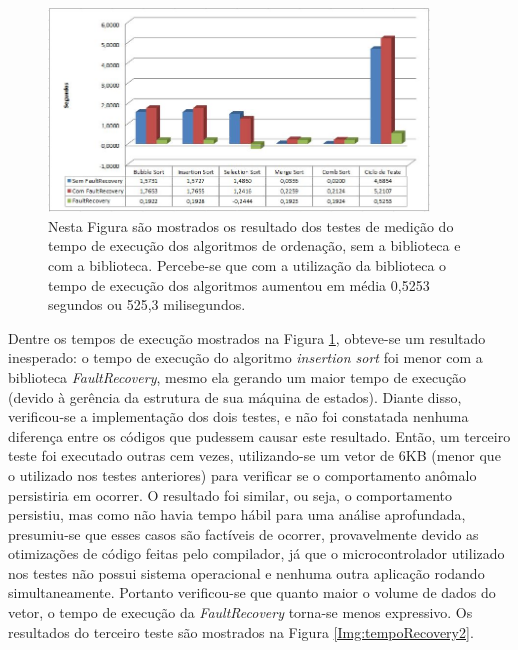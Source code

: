\begin{figure}[h]
	\centering
	\includegraphics[width=0.9\textwidth]{figuras/tempoRecovery.jpg}
	\caption[Tempo de execução da biblioteca \textit{FaultRecovery}]{Nesta Figura são mostrados os resultado dos testes de medição do tempo de execução dos algoritmos de ordenação, sem a biblioteca e com a biblioteca. Percebe-se que com a utilização da biblioteca o tempo de execução dos algoritmos aumentou em média 0,5253 segundos ou 525,3 milisegundos.}
	\label{Img:tempoRecovery}	
\end{figure}	
\newpage
Dentre os tempos de execução mostrados na Figura \ref{Img:tempoRecovery}, obteve-se um resultado inesperado: o tempo de execução do algoritmo \textit{insertion sort} foi menor com a biblioteca \textit{FaultRecovery}, mesmo ela gerando um maior tempo de execução (devido à gerência da estrutura de sua máquina de estados). Diante disso, verificou-se a implementação dos dois testes, e não foi constatada nenhuma diferença entre os códigos que pudessem causar este resultado. Então, um terceiro teste foi executado outras cem vezes, utilizando-se um vetor de 6KB (menor que o utilizado nos testes anteriores) para verificar se o comportamento anômalo persistiria em ocorrer. O resultado foi similar, ou seja, o comportamento persistiu, mas como não havia tempo hábil para uma análise aprofundada, presumiu-se que esses casos são factíveis de ocorrer, provavelmente devido as otimizações de código feitas pelo compilador, já que o microcontrolador utilizado nos testes não possui sistema operacional e nenhuma outra aplicação rodando simultaneamente. Portanto verificou-se que quanto maior o volume de dados do vetor, o tempo de execução da \textit{FaultRecovery} torna-se menos expressivo. Os resultados do terceiro teste são mostrados na Figura \ref{Img:tempoRecovery2}.


